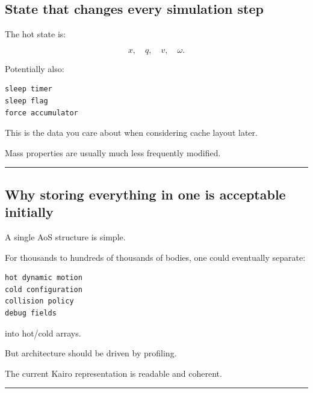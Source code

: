 \subsection{State that changes every simulation step}\label{06-engine-ii-ch037-state-that-changes-every-simulation-step}

\hypertarget{06-engine-ii-ch037-state-that-changes-every-simulation-step}{}

The hot state is:

\[
x,\quad q,\quad v,\quad\omega.
\]

Potentially also:

\begin{verbatim}
sleep timer
sleep flag
force accumulator
\end{verbatim}

This is the data you care about when considering cache layout later.

Mass properties are usually much less frequently modified.

\begin{center}\rule{0.5\linewidth}{0.5pt}\end{center}

\subsection{\texorpdfstring{Why storing everything in one  is acceptable initially}{Why storing everything in one  is acceptable initially}}\label{06-engine-ii-ch037-why-storing-everything-in-one-rigidbody-is-acceptable-initially}

\hypertarget{06-engine-ii-ch037-why-storing-everything-in-one-rigidbody-is-acceptable-initially}{}

A single AoS structure is simple.

For thousands to hundreds of thousands of bodies, one could eventually separate:

\begin{verbatim}
hot dynamic motion
cold configuration
collision policy
debug fields
\end{verbatim}

into hot/cold arrays.

But architecture should be driven by profiling.

The current Kairo representation is readable and coherent.

\begin{center}\rule{0.5\linewidth}{0.5pt}\end{center}

